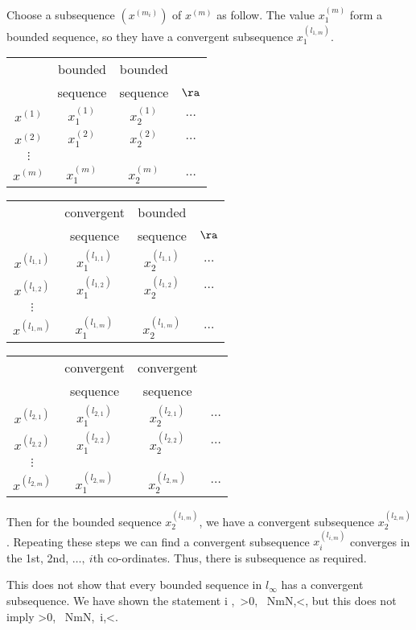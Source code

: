 \begin{solution}[\bf Solution.]Choose a subsequence $(x^{(m_i)})$ of $x^{(m)}$ as follow. The value $x_1^{(m)}$ form a bounded sequence, so they have a convergent subsequence $x_1^{(l_{1,m})}$. 
\begin{center}
\begin{tabular}{c|ccc}
 & bounded & bounded &  \\ 
 & sequence & sequence  & $\ra$ \\ \hline
$x^{(1)}$ & $x_1^{(1)}$ & $x_2^{(1)}$ & $\dots$  \\ 
$x^{(2)}$ & $x_1^{(2)}$ & $x_2^{(2)}$ & $\dots$  \\ 
$\vdots$ & & &\\
$x^{(m)}$ & $x_1^{(m)}$ & $x_2^{(m)}$ & $\dots$  
\end{tabular} 
\begin{tabular}{c|ccc}
 & convergent  & bounded  &  \\ 
 & sequence  & sequence  & $\ra$ \\ \hline
$x^{(l_{1,1})}$ & $x_1^{(l_{1,1})}$ & $x_2^{(l_{1,1})}$ & $\dots$  \\ 
$x^{(l_{1,2})}$ & $x_1^{(l_{1,2})}$ & $x_2^{(l_{1,2})}$ & $\dots$  \\ 
$\vdots$ & & & \\
$x^{(l_{1,m})}$ & $x_1^{(l_{1,m})}$ & $x_2^{(l_{1,m})}$ & $\dots$  
\end{tabular} 
\begin{tabular}{c|ccc}
 & convergent & convergent &  \\ 
 & sequence  & sequence & \\ \hline
$x^{(l_{2,1})}$ & $x_1^{(l_{2,1})}$ & $x_2^{(l_{2,1})}$ & $\dots$  \\ 
$x^{(l_{2,2})}$ & $x_1^{(l_{2,2})}$ & $x_2^{(l_{2,2})}$ & $\dots$  \\ 
$\vdots$ & & & \\
$x^{(l_{2,m})}$ & $x_1^{(l_{2,m})}$ & $x_2^{(l_{2,m})}$ & $\dots$  
\end{tabular}
\end{center}
Then for the bounded sequence $x_2^{(l_{1,m})}$, we have a convergent subsequence $x_2^{(l_{2,m})}$. Repeating these steps we can find a convergent subsequence $x_i^{(l_{i,m})}$ converges in the 1st, 2nd, $\dots,\ i$th co-ordinates. Thus, there is subsequence as required. 

This does not show that every bounded sequence in $l_{\infty}$ has a convergent subsequence. We have shown the statement
\be
\forall i \in \N,\ \forall \ve>0, \ \exists N\in\N {}\forall m\geq N,\quad {}<\ve,
\ee
but this does not imply
\be
\forall \ve >0, \ \exists N\in\N {}\forall m\geq N,\ \forall i\in \N,\quad {}<\ve.
\ee


\end{solution}
